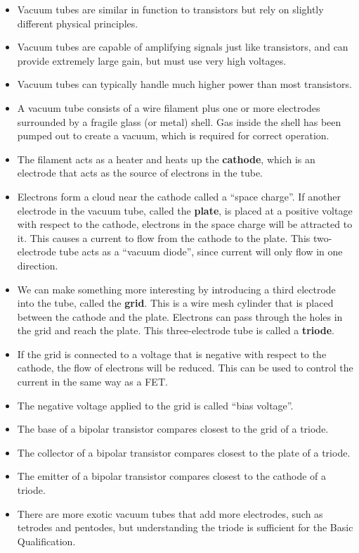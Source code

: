 \documentclass[letterpaper,12pt]{scrartcl}
\begin{document}
\begin{itemize}
\item Vacuum tubes are similar in function to transistors but rely on slightly different physical principles.
\item Vacuum tubes are capable of amplifying signals just like transistors, and can provide extremely large gain, but must use very high voltages.
\item Vacuum tubes can typically handle much higher power than most transistors.
\item A vacuum tube consists of a wire filament plus one or more electrodes surrounded by a fragile glass (or metal) shell. Gas inside the shell has been pumped out to create a vacuum,
which is required for correct operation.
\item The filament acts as a heater and heats up the \textbf{cathode}, which is an electrode that acts as the source of electrons in the tube.
\item Electrons form a cloud near the cathode called a ``space charge''. If another electrode in the vacuum tube, called the \textbf{plate}, is placed at a positive voltage with respect to the cathode,
electrons in the space charge will be attracted to it. This causes a current to flow from the cathode to the plate.
This two-electrode tube acts as a ``vacuum diode'', since current will only flow in one direction.
\item We can make something more interesting by introducing a third electrode into the tube, called the \textbf{grid}. This is a wire mesh cylinder that is placed between the cathode and the plate. 
Electrons can pass through the holes in the grid and reach the plate. This three-electrode tube is called a \textbf{triode}.
\item If the grid is connected to a voltage that is negative with respect to the cathode, the flow of electrons will be reduced. This can be used to control the current in the same way as a FET.
\item The negative voltage applied to the grid is called ``bias voltage''.
\item The base of a bipolar transistor compares closest to the grid of a triode.
\item The collector of a bipolar transistor compares closest to the plate of a triode.
\item The emitter of a bipolar transistor compares closest to the cathode of a triode.
\item There are more exotic vacuum tubes that add more electrodes, such as tetrodes and pentodes, but understanding the triode is sufficient for the Basic Qualification.
\end{itemize}
\end{document}
